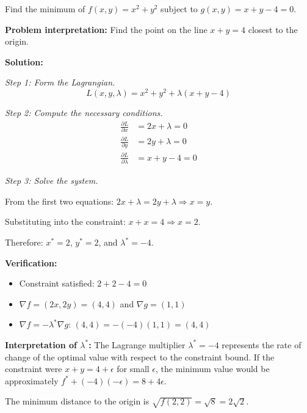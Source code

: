 

\begin{examplebox}[title=Example: Lagrange Multipliers for Constrained Optimization]
Find the minimum of $f(x, y) = x^2 + y^2$ subject to $g(x, y) = x + y - 4 = 0$.

\textbf{Problem interpretation:} Find the point on the line $x + y = 4$ closest to the origin.

\textbf{Solution:}

\textit{Step 1: Form the Lagrangian.}
\begin{equation}
L(x, y, \lambda) = x^2 + y^2 + \lambda(x + y - 4)
\end{equation}

\textit{Step 2: Compute the necessary conditions.}
\begin{align}
\frac{\partial L}{\partial x} &= 2x + \lambda = 0 \\
\frac{\partial L}{\partial y} &= 2y + \lambda = 0 \\
\frac{\partial L}{\partial \lambda} &= x + y - 4 = 0
\end{align}

\textit{Step 3: Solve the system.}

From the first two equations: $2x + \lambda = 2y + \lambda \Rightarrow x = y$.

Substituting into the constraint: $x + x = 4 \Rightarrow x = 2$.

Therefore: $x^* = 2$, $y^* = 2$, and $\lambda^* = -4$.

\textbf{Verification:}
\begin{itemize}
    \item Constraint satisfied: $2 + 2 - 4 = 0$ \checkmark
    \item $\nabla f = (2x, 2y) = (4, 4)$ and $\nabla g = (1, 1)$
    \item $\nabla f = -\lambda^* \nabla g$: $(4, 4) = -(-4)(1, 1) = (4, 4)$ \checkmark
\end{itemize}

\textbf{Interpretation of $\lambda^*$:} The Lagrange multiplier $\lambda^* = -4$ represents the rate of change of the optimal value with respect to the constraint bound. If the constraint were $x + y = 4 + \epsilon$ for small $\epsilon$, the minimum value would be approximately $f^* + (-4)(-\epsilon) = 8 + 4\epsilon$.

The minimum distance to the origin is $\sqrt{f(2,2)} = \sqrt{8} = 2\sqrt{2}$.
\end{examplebox}

